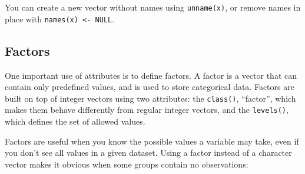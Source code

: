 You can create a new vector without names using \texttt{unname(x)}, or
remove names in place with \texttt{names(x) \textless{}- NULL}.

\subsection{Factors}

One important use of attributes is to define factors. A factor is a
vector that can contain only predefined values, and is used to store
categorical data. Factors are built on top of integer vectors using two
attributes: the \texttt{class()}, ``factor'', which makes them behave
differently from regular integer vectors, and the \texttt{levels()},
which defines the set of allowed values. 

\begin{Shaded}
\begin{Highlighting}[]
\StringTok{ }\NormalTok{(}\NormalTok{(}\NormalTok{, }\NormalTok{, }\NormalTok{, }\NormalTok{))}

\NormalTok{x[}\NormalTok{] <-}

\NormalTok{(}\NormalTok{(}\NormalTok{), }\NormalTok{(}\NormalTok{))}
\end{Highlighting}
\end{Shaded}

Factors are useful when you know the possible values a variable may
take, even if you don't see all values in a given dataset. Using a
factor instead of a character vector makes it obvious when some groups
contain no observations:

\begin{Shaded}
\begin{Highlighting}[]
\StringTok{ }\NormalTok{(}\NormalTok{, }\NormalTok{, }\NormalTok{)}
\StringTok{ } \NormalTok{(}\NormalTok{, }\NormalTok{))}

\end{Highlighting}
\end{Shaded}

